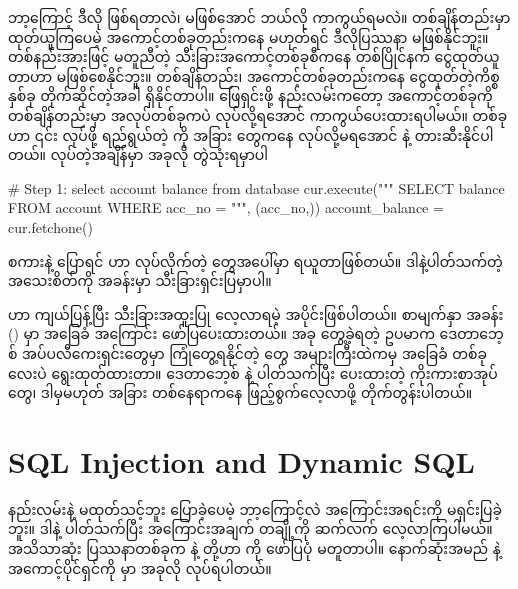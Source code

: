 ဘာ့ကြောင့် ဒီလို ဖြစ်ရတာလဲ၊ မဖြစ်အောင် ဘယ်လို ကာကွယ်ရမလဲ။ တစ်ချိန်တည်းမှာ ထုတ်ယူကြပေမဲ့ အကောင့်တစ်ခုတည်းကနေ မဟုတ်ရင်  ဒီလိုပြဿနာ မဖြစ်နိုင်ဘူး။ တစ်နည်းအားဖြင့် မတူညီတဲ့ သီးခြားအကောင့်တစ်ခုစီကနေ တစ်ပြိုင်နက် ငွေထုတ်ယူတာဟာ  မဖြစ်စေနိုင်ဘူး။ တစ်ချိန်တည်း၊ အကောင့်တစ်ခုတည်းကနေ ငွေထုတ်တဲ့ကိစ္စနှစ်ခု တိုက်ဆိုင်တဲ့အခါ  ရှိနိုင်တာပါ။ ဖြေရှင်းဖို့ နည်းလမ်းကတော့ အကောင့်တစ်ခုကို တစ်ချိန်တည်းမှာ အလုပ်တစ်ခုကပဲ  လုပ်လို့ရအောင် ကာကွယ်ပေးထားရပါမယ်။  တစ်ခုဟာ ၎င်း  လုပ်ဖို့ ရည်ရွယ်တဲ့  ကို အခြား  တွေကနေ  လုပ်လို့မရအောင်  နဲ့ တားဆီးနိုင်ပါတယ်။  လုပ်တဲ့အချိန်မှာ အခုလို တွဲသုံးရမှာပါ    
%
\begin{py}
# Step 1: select account balance from database
cur.execute("""
    SELECT balance FROM account WHERE acc_no = %
""", (acc_no,))
account_balance = cur.fetchone()
\end{py}
% 
 စကားနဲ့ ပြောရင်  ဟာ  လုပ်လိုက်တဲ့  တွေအပေါ်မှာ  ရယူတာဖြစ်တယ်။ ဒါနဲ့ပါတ်သက်တဲ့ အသေးစိတ်ကို  အခန်းမှာ သီးခြားရှင်းပြမှာပါ။ 

 ဟာ ကျယ်ပြန့်ပြီး သီးခြားအထူးပြု လေ့လာရမဲ့ အပိုင်းဖြစ်ပါတယ်။ စာမျက်နှာ \fRefNo{\pageref{ch:concurrency}} အခန်း (\fRefNo{\ref{ch:concurrency}}) မှာ အခြေခံ  အကြောင်း ဖော်ပြပေးထားတယ်။ အခု တွေ့ခဲ့ရတဲ့ ဥပမာက ဒေတာဘေ့စ် အပ်ပလီကေးရှင်းတွေမှာ ကြုံတွေ့ရနိုင်တဲ့  တွေ အများကြီးထဲကမှ အခြေခံ တစ်ခုလေးပဲ ရွေးထုတ်ထားတာ။ ဒေတာဘေ့စ်  နဲ့ ပါတ်သက်ပြီး ပေးထားတဲ့ ကိုးကားစာအုပ်တွေ၊ ဒါမှမဟုတ် အခြား တစ်နေရာကနေ ဖြည့်စွက်လေ့လာဖို့ တိုက်တွန်းပါတယ်။ 

\section{SQL Injection and Dynamic SQL}
 နည်းလမ်းနဲ့  မထုတ်သင့်ဘူး ပြောခဲ့ပေမဲ့ ဘာ့ကြောင့်လဲ အကြောင်းအရင်းကို မရှင်းပြခဲ့ဘူး။ ဒါနဲ့ ပါတ်သက်ပြီး အကြောင်းအချက် တချို့ကို ဆက်လက် လေ့လာကြပါမယ်။ အသိသာဆုံး ပြဿနာတစ်ခုက  နဲ့  တို့ဟာ  ကို ဖော်ပြပုံ မတူတာပါ။ နောက်ဆုံးအမည်  နဲ့ အကောင့်ပိုင်ရှင်ကို  မှာ အခုလို  လုပ်ရပါတယ်။ 

